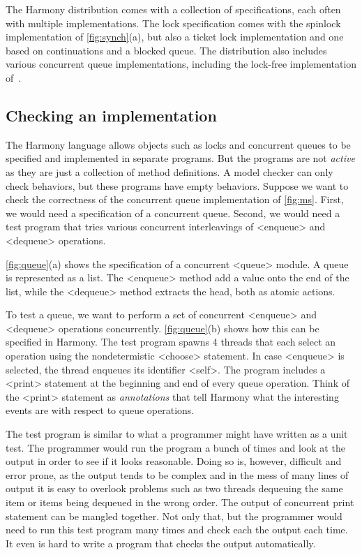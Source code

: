\documentclass[twocolumn]{article}
\begin{document}
The Harmony distribution comes with a collection of specifications,
each often with multiple implementations.  The lock specification
comes with the spinlock implementation of \autoref{fig:synch}(a), but
also a ticket lock implementation and one based on continuations and
a blocked queue.  The distribution also includes various concurrent
queue implementations, including the lock-free implementation
of~\cite{MS96}.

\subsection{Checking an implementation}

The Harmony language allows objects such as locks and concurrent queues
to be specified and implemented in separate programs.  But the programs
are not \emph{active} as they are just a collection of method definitions.
A model checker can only check behaviors, but these programs have empty
behaviors.
Suppose we want to check the correctness of the concurrent queue
implementation of \autoref{fig:ms}.  First, we would need a specification
of a concurrent queue.  Second, we would need a test program that tries
various concurrent interleavings of <{enqueue}> and <{dequeue}> operations.

\autoref{fig:queue}(a) shows the specification of a concurrent
<{queue}> module.  A queue is represented as a list.
The <{enqueue}> method add a value onto the end of the list,
while the <{dequeue}> method extracts the head, both as atomic actions.

To test a queue, we want to perform a set of concurrent <{enqueue}>
and <{dequeue}> operations concurrently.
\autoref{fig:queue}(b) shows how this can be specified in Harmony.
The test program spawns 4 threads that each select an operation
using the nondetermistic <{choose}> statement.  In case <{enqueue}>
is selected, the thread enqueues its identifier <{self}>.  The program
includes a <{print}> statement at the beginning and end of every queue
operation.  Think of the <{print}> statement as \emph{annotations}
that tell Harmony what the interesting events are with respect to
queue operations.

The test program is similar to what a programmer might have written
as a unit test.  The programmer would run the program a bunch of
times and look at the output in order to see if it looks reasonable.
Doing so is, however, difficult and error prone, as the output tends
to be complex and in the mess of many lines of output it is easy
to overlook problems such as two threads dequeuing the same item
or items being dequeued in the wrong order.  The output of concurrent
print statement can be mangled together.  Not only that, but the
programmer would need to run this test program many times and check
each the output each time.  It even is hard to write a program that
checks the output automatically.
\end{document}
